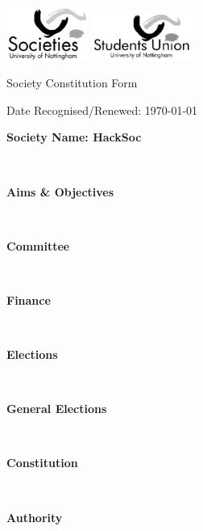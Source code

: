 \documentclass[a4paper,twoside,notitlepage,11pt]{article}
\newcommand{\paperTitle}{Society Constitution Form}
\newcommand{\consHead}[1]{\begin{Large}\textbf{#1}\end{Large}\ \\}
\begin{document}
\thispagestyle{empty}
\begin{center}
\includegraphics[width=0.2\textwidth]{img/socLogo.png}
\includegraphics[width=0.25\textwidth]{img/suLogo.png}
\ \\
	\begin{LARGE}
		\paperTitle \\
	\end{LARGE}
\end{center}
\begin{flushright}
Date Recognised/Renewed: \today \\
\end{flushright}




\noindent
\consHead{Society Name: HackSoc}
\consHead{Aims \& Objectives}
\consHead{Committee}
\consHead{Finance}
\consHead{Elections}
\consHead{General Elections}
\consHead{Constitution}
\consHead{Authority}
\end{document}
